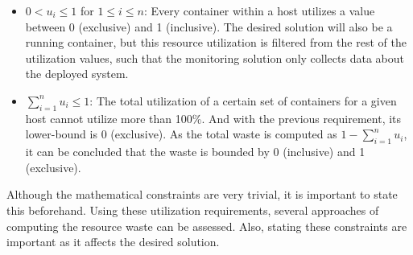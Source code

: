 \begin{itemize}
    \item $0 < u_i \leq 1$ for $1 \leq i \leq n$: Every container within a host utilizes a value between 0 (exclusive) and 1 (inclusive). The desired solution will also be a running container, but this resource utilization is filtered from the rest of the utilization values, such that the monitoring solution only collects data about the deployed system.
    \item $\sum_{i=1}^n u_i \leq 1$: The total utilization of a certain set of containers for a given host cannot utilize more than 100\%. And with the previous requirement, its lower-bound is 0 (exclusive). As the total waste is computed as $1 - \sum_{i=1}^n u_i$, it can be concluded that the waste is bounded by 0 (inclusive) and 1 (exclusive).
\end{itemize}

Although the mathematical constraints are very trivial, it is important to state this beforehand. Using these utilization requirements, several approaches of computing the resource waste can be assessed. Also, stating these constraints are important as it affects the desired solution.

 